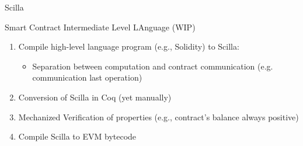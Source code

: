 \begin{frame}{Scilla~\cite{scilla}}
\begin{block}{Smart Contract Intermediate Level LAnguage (WIP)}
\begin{enumerate}
\item Compile high-level language program (e.g., Solidity) to Scilla:
\begin{itemize}
\item Separation between computation and contract communication (e.g. communication last operation)
\end{itemize}
\item Conversion of Scilla in Coq (yet manually)
\item Mechanized Verification of properties (e.g., contract's balance always positive)
\item Compile Scilla to EVM bytecode
\end{enumerate}
\end{block}

\end{frame}